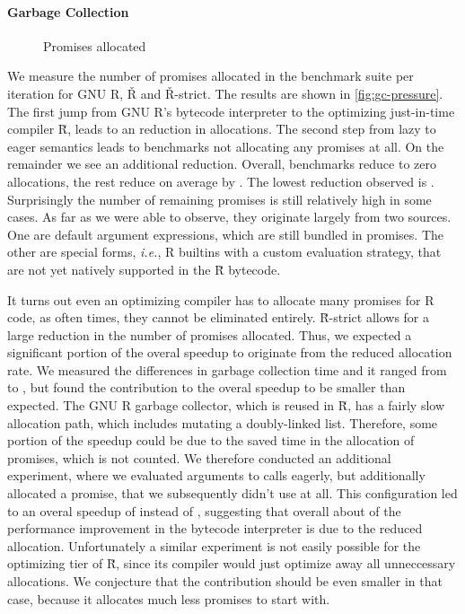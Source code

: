 \documentclass[review,nonacm,screen,acmsmall,anonymous=true]{acmart}
\newcommand{\authorcomment}[3]{}
\newcommand{\OF}[1]{\authorcomment{magenta}{OF}{#1}}
\renewcommand{\Rsh}{{\sf\u R}\xspace}
\newcommand{\Rshstrict}{{\sf\u R-strict}\xspace}
\newcommand{\ie}{\emph{i.e.},\xspace}
\begin{document}
\paragraph{Garbage Collection}

\begin{figure}[h]
  \centering
  
  \caption{Promises allocated}
  \label{fig:gc-pressure}
\end{figure}
We measure the number of promises allocated in the
benchmark suite per iteration for GNU R, Ř and Ř-strict. The results are shown in
\autoref{fig:gc-pressure}. The first jump from GNU R's bytecode interpreter to
the optimizing just-in-time compiler \Rsh, leads to an \promiseAlocationReductionGnurRsh
reduction in allocations. The second step
from lazy to eager semantics leads to \promiseAlocationReductionRshStrictToZero
benchmarks not allocating any promises at all. On the remainder we see an additional
\promiseAlocationReductionRshStrict reduction.
Overall, \promiseAlocationReductionRshStrictToZero benchmarks reduce to zero
allocations, the rest reduce on average by \promiseAlocationReductionGnurRshStrict.
The lowest reduction observed is
\promiseAlocationReductionGnurRshStrictMin.
Surprisingly the number of remaining promises is
still relatively high in some cases. As far as we were able to observe, they
originate largely from two sources. One are default argument expressions, which
are still bundled in promises. \OF{which bms and how much?} The other are special forms, 
\ie R builtins with a custom evaluation
strategy, that are not yet natively supported in the \Rsh bytecode.

It turns out even an optimizing compiler has to allocate many promises for R
code, as often times, they cannot be eliminated entirely. \Rshstrict allows for
a large reduction in the number of promises allocated.
Thus, we expected a significant portion of the overal speedup to originate from
the reduced allocation rate. We measured the differences in garbage collection
time and it ranged from \speedupGCRshStrictMin to \speedupGCRshStrictMax, but
found the contribution to the overal speedup to be smaller than expected.
The GNU R garbage collector, which is reused in \Rsh, has a fairly slow allocation path, which
includes mutating a doubly-linked list. Therefore, some portion of the speedup
could be due to the saved time in the allocation of promises, which is not counted.
We therefore conducted an additional experiment, where we evaluated arguments to
calls eagerly, but additionally allocated a promise, that we subsequently didn't
use at all. This configuration led to an overal speedup of
\speedupBCRshStrictAlloc instead of \speedupBCRshStrict, suggesting that overall
about \speedupDueToReducedGC of the performance improvement in the bytecode interpreter is due to the
reduced allocation. Unfortunately a similar experiment is not easily possible
for the optimizing tier of \Rsh, since its compiler would just optimize away all
unneccessary allocations. We conjecture that the contribution should be even
smaller in that case, because it allocates much less promises to start with.
\end{document}
